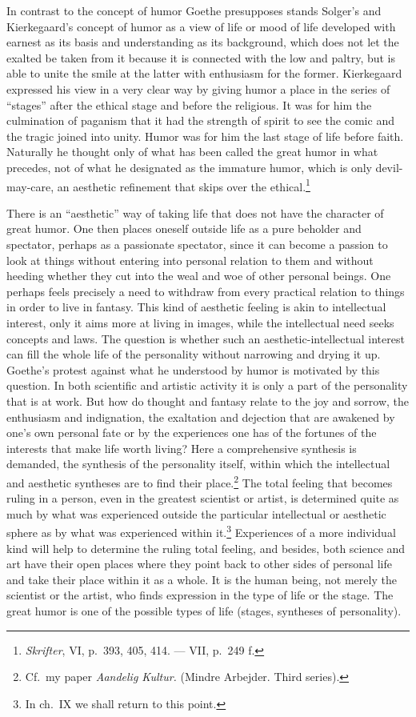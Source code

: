 \documentclass[12pt]{book}
\newcommand{\opage}[1]{\marginnote{\footnotesize\textit{[#1]}}}
\begin{document}
In contrast to the concept of humor Goethe presupposes stands Solger's and
Kierkegaard's concept of humor as a view of life or mood of life developed with earnest
as its basis and understanding as its background, which does not let the exalted be
taken from it because it is connected with the low and paltry, but is able to unite the
smile at the latter with enthusiasm for the former. Kierkegaard expressed his view in a
very clear way by giving humor a place in the series of ``stages'' after the ethical
stage and before the religious. It was for him the culmination of paganism that it had
the strength of spirit to see the comic and the tragic joined into unity. Humor was for
him the last stage of life before faith. Naturally he thought only of what has been
called the great humor in what precedes, not of what he designated as the immature
humor, which is only devil-may-care, an aesthetic refinement that skips over the
ethical.\footnote{\textit{Skrifter}, VI, p.~393, 405, 414. --- VII, p.~249 f.}

There is an ``aesthetic'' way of taking life that does not have the character of great
humor. One then places oneself outside life as a pure beholder and spectator, perhaps
as a passionate spectator, since it can become a passion to look at things without
entering into personal relation to them and without heeding whether they cut into the
weal and woe of other personal beings. One perhaps feels precisely a need to withdraw
from every practical relation to things in order to live in fantasy. This kind of
aesthetic feeling is akin to intellectual interest, only it aims more \opage{94}at
living in images, while the intellectual need seeks concepts and laws. The question is
whether such an aesthetic-intellectual interest can fill the whole life of the
personality without narrowing and drying it up. Goethe's protest against what he
understood by humor is motivated by this question. In both scientific and artistic
activity it is only a part of the personality that is at work. But how do thought and
fantasy relate to the joy and sorrow, the enthusiasm and indignation, the exaltation and
dejection that are awakened by one's own personal fate or by the experiences one has of
the fortunes of the interests that make life worth living? Here a comprehensive
synthesis is demanded, the synthesis of the personality itself, within which the
intellectual and aesthetic syntheses are to find their place.\footnote{Cf.\ my paper
\textit{Aandelig Kultur.} (Mindre Arbejder. Third series).} The total feeling that
becomes ruling in a person, even in the greatest scientist or artist, is determined
quite as much by what was experienced outside the particular intellectual or aesthetic
sphere as by what was experienced within it.\footnote{In ch.~IX we shall return to this
point.} Experiences of a more individual kind will help to determine the ruling total
feeling, and besides, both science and art have their open places where they point back
to other sides of personal life and take their place within it as a whole. It is the
human being, not merely the scientist or the artist, who finds expression in the type
of life or the stage. The great humor is one of the possible types of life (stages,
syntheses of personality).
\end{document}
